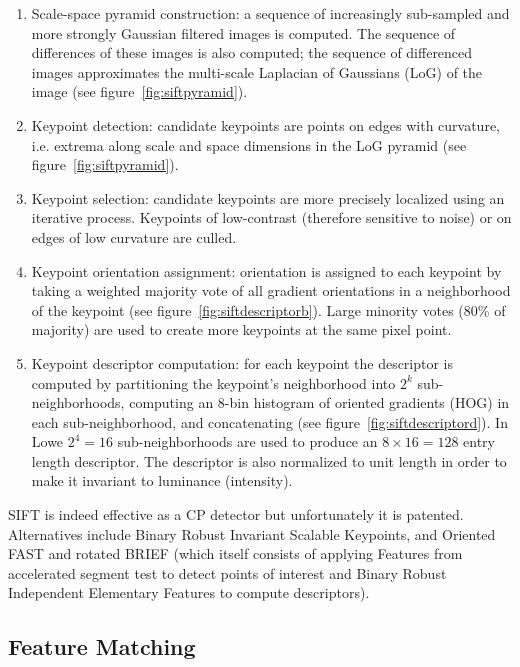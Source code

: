 \begin{framed}
	\begin{enumerate}
		\item Scale-space pyramid construction: a sequence of increasingly sub-sampled and more strongly Gaussian filtered images is computed. The sequence of differences of these images is also computed; the sequence of differenced images approximates the multi-scale Laplacian of Gaussians (LoG) of the image (see figure~\ref{fig:siftpyramid}).
		\item Keypoint detection: candidate keypoints are points on edges with curvature, i.e. extrema along scale and space dimensions in the LoG pyramid (see figure~\ref{fig:siftpyramid}).
		\item Keypoint selection: candidate keypoints are more precisely localized using an iterative process. Keypoints of low-contrast (therefore sensitive to noise) or on edges of low curvature are culled.
		\item Keypoint orientation assignment: orientation is assigned to each keypoint by taking a weighted majority vote of all gradient orientations in a neighborhood of the keypoint (see figure~\ref{fig:siftdescriptorb}). Large minority votes (80\% of majority) are used to create more keypoints at the same pixel point.
		\item Keypoint descriptor computation: for each keypoint the descriptor is computed by partitioning the keypoint's neighborhood into \(2^k\) sub-neighborhoods, computing an 8-bin histogram of oriented gradients (HOG) in each sub-neighborhood, and concatenating (see figure~\ref{fig:siftdescriptord}). In Lowe \etal\cite{lowe2004distinctive} \(2^4=16\) sub-neighborhoods are used to produce an \(8\times16 = 128\) entry length descriptor. The descriptor is also normalized to unit length in order to make it invariant to luminance (intensity).
	\end{enumerate}
\end{framed}

SIFT is indeed effective as a CP detector but unfortunately it is patented.
%
Alternatives include Binary Robust Invariant Scalable Keypoints\cite{leutenegger2011brisk}, and Oriented FAST and rotated BRIEF\cite{rublee2011orb} (which itself consists of applying Features from accelerated segment test\cite{rosten2006machine} to detect points of interest and Binary Robust Independent Elementary Features\cite{calonder2010brief} to compute descriptors).

\subsection{Feature Matching}

